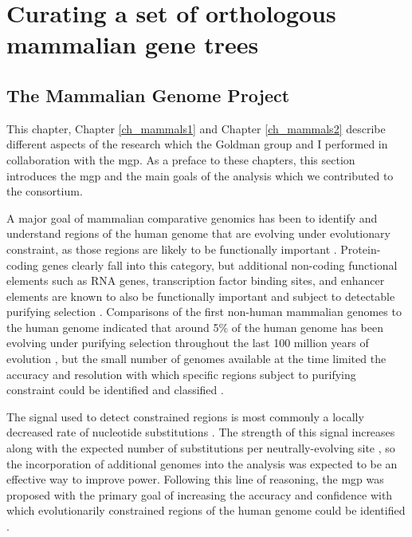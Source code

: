 \chapter{Curating a set of orthologous mammalian gene trees}
\label{ch_orthologs}
\acresetall
\section{The Mammalian Genome Project}

This chapter, Chapter \ref{ch_mammals1} and Chapter \ref{ch_mammals2}
describe different aspects of the research which the Goldman group and
I performed in collaboration with the \ac{mgp}. As a preface to these
chapters, this section introduces the \ac{mgp} and the main goals of
the analysis which we contributed to the consortium.

A major goal of mammalian comparative genomics has been to identify
and understand regions of the human genome that are evolving under
evolutionary constraint, as those regions are likely to be
functionally important \citep{Mouse2002Initial}. Protein-coding genes
clearly fall into this category, but additional non-coding functional
elements such as RNA genes, transcription factor binding sites, and
enhancer elements are known to also be functionally important and
subject to detectable purifying selection
\citep{Birney2007}. Comparisons of the first non-human mammalian
genomes to the human genome indicated that around 5\% of the human
genome has been evolving under purifying selection throughout the last
100 million years of evolution
\citep{Mouse2002Initial,Cooper2004,Rat2004Genome,LindbladToh2005Genome},
but the small number of genomes available at the time limited the
accuracy and resolution with which specific regions subject to
purifying constraint could be identified and classified
\citep{Ponting2011}.

The signal used to detect constrained regions is most commonly a
locally decreased rate of nucleotide substitutions
\citep{Cooper2004}. The strength of this signal increases along with
the expected number of substitutions per neutrally-evolving site
\citep{Siepel2005}, so the incorporation of additional genomes into
the analysis was expected to be an effective way to improve
power. Following this line of reasoning, the \ac{mgp} was proposed
with the primary goal of increasing the accuracy and confidence with
which evolutionarily constrained regions of the human genome could be
identified \citep{Margulies2005Initial,Margulies2007}.

